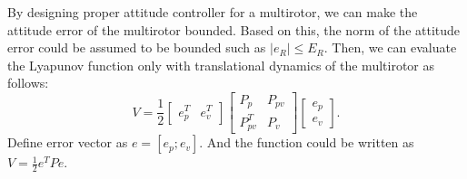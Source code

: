 \documentclass{article}
\begin{document}
\newpage
By designing proper attitude controller for a multirotor, we can make the attitude error of the multirotor bounded.
Based on this, the norm of the attitude error could be assumed to be bounded such as $|e_R| \leq E_R$.
Then, we can evaluate the Lyapunov function only with translational dynamics of the multirotor as follows:
\begin{equation}
    V = \frac{1}{2}\left[
        \begin{array}{cc}
        e_p^T & e_v^T
        \end{array}
        \right] 
        \left[
        \begin{array}{cc}
		P_p & P_{pv} \\ P_{pv}^T & P_v
        \end{array}
        \right]
		\left[
		\begin{array}{c}
		e_p \\ e_v
		\end{array}
		\right]. \nonumber
\end{equation}
Define error vector as $e = [e_p;e_v]$. And the function could be written as $V=\frac{1}{2}e^TPe$.
\end{document}
